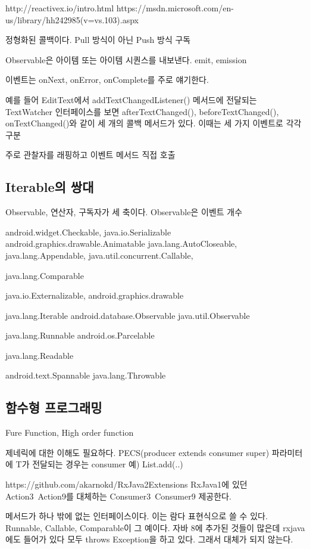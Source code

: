 \documentclass{book}
\begin{document}
http://reactivex.io/intro.html
https://msdn.microsoft.com/en-us/library/hh242985(v=vs.103).aspx

정형화된 콜백이다.
Pull 방식이 아닌 Push 방식 구독

Observable은 아이템 또는 아이템 시퀀스를 내보낸다.
emit, emission

이벤트는 onNext, onError, onComplete를 주로 얘기한다.

예를 들어 EditText에서 addTextChangedListener() 메서드에 전달되는 TextWatcher 인터페이스를 보면 afterTextChanged(), beforeTextChanged(), onTextChanged()와 같이 세 개의 콜백 메서드가 있다. 이때는 세 가지 이벤트로 각각 구분

주로 관찰자를 래핑하고 이벤트 메서드 직접 호출
\subsection{Iterable의 쌍대}

Observable, 연산자, 구독자가 세 축이다.
Observable은 이벤트 개수



android.widget.Checkable, java.io.Serializable
android.graphics.drawable.Animatable
java.lang.AutoCloseable, java.lang.Appendable, 
java.util.concurrent.Callable,

java.lang.Comparable

java.io.Externalizable, 
android.graphics.drawable

java.lang.Iterable
	android.database.Observable
		java.util.Observable
		
java.lang.Runnable
android.os.Parcelable

java.lang.Readable

android.text.Spannable
	java.lang.Throwable

\subsection{함수형 프로그래밍}
Fure Function, High order function


제네릭에 대한 이해도 필요하다.
PECS(producer extends consumer super)
파라미터에 T가 전달되는 경우는 consumer
예) List.add(..)


https://github.com/akarnokd/RxJava2Extensions
RxJava1에 있던 Action3~Action9를 대체하는 Consumer3~Consumer9  제공한다.

메서드가 하나 밖에 없는 인터페이스이다.
이는 람다 표현식으로 쓸 수 있다.
Runnable, Callable, Comparable이 그 예이다.
자바 8에 추가된 것들이 많은데 rxjava에도 들어가 있다
모두 throws Exception을 하고 있다. 그래서 대체가 되지 않는다.
\end{document}
